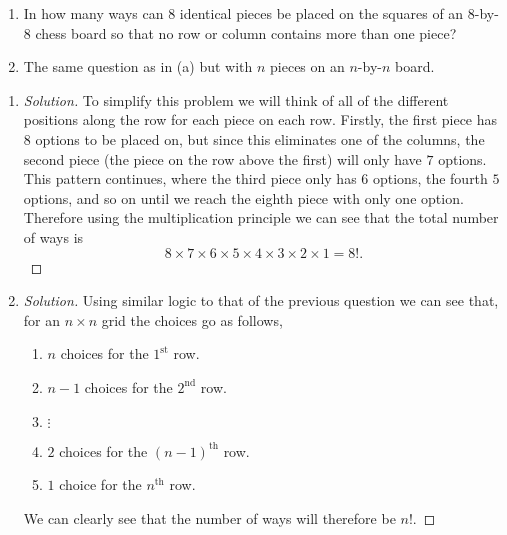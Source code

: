\documentclass[10pt, a4paper]{article}
\begin{document}
\newpage

\begin{problem}[Q12]\phantom{}
    \begin{enumerate}[label = (\alph*)]
        \item In how many ways can $8$ identical pieces be placed on the squares of an $8$-by-$8$ chess board so that no row or column contains more than one piece?
        \item The same question as in (a) but with $n$ pieces on an $n$-by-$n$ board.
    \end{enumerate}
    \begin{enumerate}[label = (\alph*)]
        \item 
        \begin{proof}[Solution]\renewcommand{\qedsymbol}{}
            To simplify this problem we will think of all of the different positions along the row for each piece on each row. Firstly, the first piece has $8$ options to be placed on, but since this eliminates one of the columns, the second piece (the piece on the row above the first) will only have $7$ options. This pattern continues, where the third piece only has $6$ options, the fourth $5$ options, and so on until we reach the eighth piece with only one option. Therefore using the multiplication principle we can see that the total number of ways is
            \[
            8 \times 7 \times 6 \times 5 \times 4 \times 3 \times 2 \times 1 = 8!.
            \]
        \end{proof}
        \item 
        \begin{proof}[Solution]\renewcommand{\qedsymbol}{}
            Using similar logic to that of the previous question we can see that, for an $n\times n$ grid the choices go as follows,
            \begin{enumerate}[label = {}]
                \item $n$ choices for the $1^{\text{st}}$ row.
                \item $n - 1$ choices for the $2^{\text{nd}}$ row.
                \item $\vdots$
                \item $2$ choices for the $(n - 1)^{\text{th}}$ row.
                \item $1$ choice for the $n^{\text{th}}$ row.
            \end{enumerate}
            We can clearly see that the number of ways will therefore be $n!$.
        \end{proof}
    \end{enumerate}
\end{problem}
\end{document}
